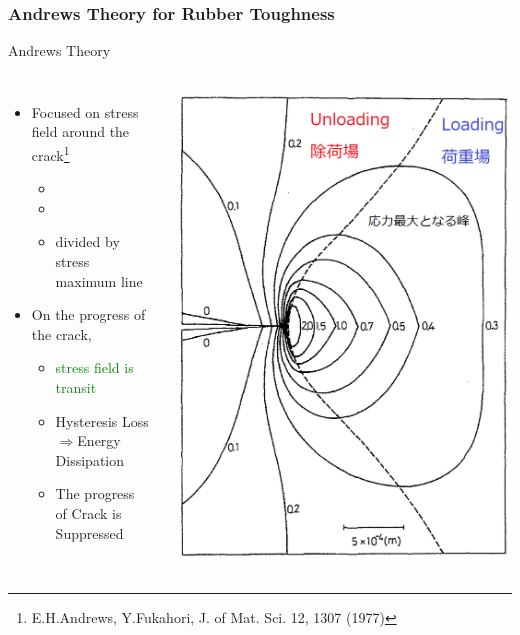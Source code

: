 \documentclass[12pt, dvipdfmx]{beamer}
\begin{document}
\begin{frame}
	\frametitle{Andrews Theory for Rubber Toughness}
		\begin{exampleblock}{Andrews Theory}
			\begin{columns}[T, onlytextwidth]
				\begin{itemize}
					\item Focused on stress field around the crack\footnote{
						\scriptsize
			{E.H.Andrews, Y.Fukahori, J. of Mat. Sci. 12, 1307 (1977)}
					}
						\begin{itemize}
							\item \color{blue}{Stress Loading zone}
							\item \color{red}{Unloading one}
							\item divided by stress maximum line
						\end{itemize}
					\item On the progress of the crack, 
						\begin{itemize}
							\item \textcolor{green}{stress field is transit}
							\item Hysteresis Loss$\Rightarrow${Energy Dissipation}
							\item The progress of Crack is \alert{Suppressed}
						\end{itemize}
				\end{itemize}
					\begin{center}
						\includegraphics[width=.85\textwidth]{crack.png}

\end{center}
\end{columns}
\end{exampleblock}
\end{frame}
\end{document}
